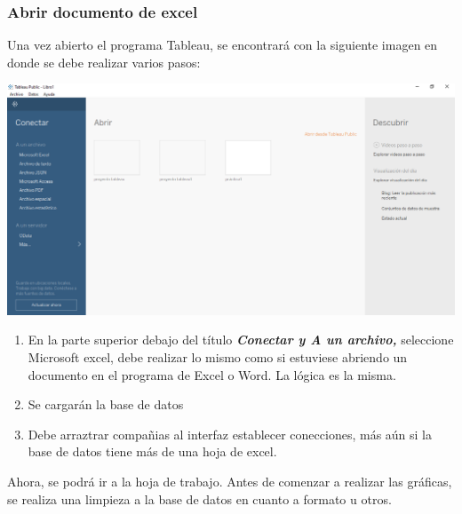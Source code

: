 \documentclass[
]{article}
\providecommand{\tightlist}{%
  \setlength{\itemsep}{0pt}\setlength{\parskip}{0pt}}
\begin{document}
\hypertarget{abrir-documento-de-excel}{%
\subsubsection{Abrir documento de
excel}\label{abrir-documento-de-excel}}

Una vez abierto el programa Tableau, se encontrará con la siguiente
imagen en donde se debe realizar varios pasos:

\includegraphics{imagenes/pr1.png}

\begin{enumerate}
\def\labelenumi{\arabic{enumi}.}
\tightlist
\item
  En la parte superior debajo del título \textbf{\emph{Conectar y A un
  archivo,}} seleccione Microsoft excel, debe realizar lo mismo como si
  estuviese abriendo un documento en el programa de Excel o Word. La
  lógica es la misma.
\item
  Se cargarán la base de datos
\item
  Debe arraztrar compañias al interfaz establecer conecciones, más aún
  si la base de datos tiene más de una hoja de excel.
\end{enumerate}

Ahora, se podrá ir a la hoja de trabajo. Antes de comenzar a realizar
las gráficas, se realiza una limpieza a la base de datos en cuanto a
formato u otros.
\end{document}
